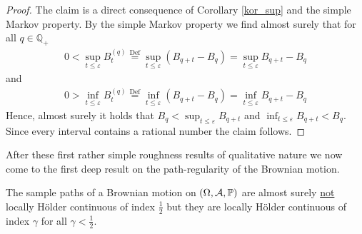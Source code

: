 \begin{proof}[Proof]
	The claim is a direct consequence of Corollary \ref{kor_sup} and the simple Markov property. By the simple Markov property we find almost surely that for all $q\in \mathbb{Q_+}$
	\begin{align*}
		0 < \sup_{t\leq \varepsilon} B_t^{(q)} \overset{\text{Def}}{=} \sup_{t\leq \varepsilon} \left(B_{q+t} - B_q \right) = \sup_{t\leq \varepsilon}B_{q+t} - B_q
	\end{align*}
	and 
	\begin{align*}
		0 > \inf_{t\leq \varepsilon} B_t^{(q)} \overset{\text{Def}}{=} \inf_{t\leq \varepsilon} \left(B_{q+t} - B_q \right) = \inf_{t\leq \varepsilon}B_{q+t} - B_q
	\end{align*}
	Hence, almost surely it holds that $B_q < \sup_{t\leq \varepsilon} B_{q+t}$ and $ \inf_{t\leq \varepsilon} B_{q+t}< B_q$. Since every interval contains a rational number the claim follows.
\end{proof}
After these first rather simple roughness results of qualitative nature we now come to the first deep result on the path-regularity of the Brownian motion.
\begin{lSatzHerz}
\begin{theorem}
	The sample paths of a Brownian motion on $(\Omega, \mathcal A, \P)$ are almost surely \underline{not} locally H\"older continuous of index $\frac{1}{2}$ but they are locally H\"older continuous of index $\gamma$ for all $\gamma<\frac{1}{2}$.
\end{theorem}
\end{lSatzHerz}
